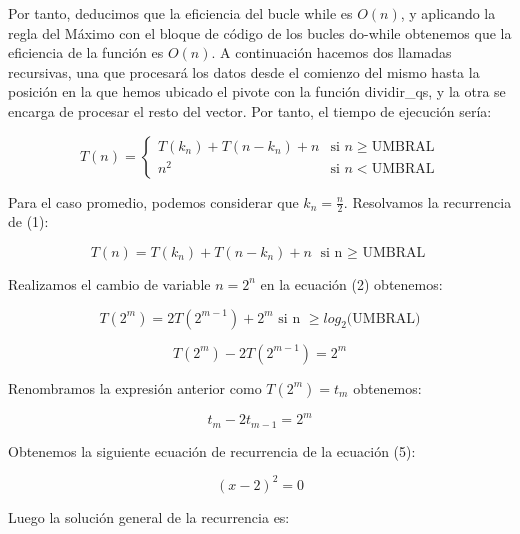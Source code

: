 \documentclass{homework}
\begin{document}
    Por tanto, deducimos que la eficiencia del bucle while es $O(n)$, y aplicando la regla del 
    Máximo con el bloque de código de los bucles do-while obtenemos que la eficiencia de la función es $O(n)$. A continuación hacemos dos llamadas
    recursivas, una que procesará los datos desde el comienzo del mismo hasta la posición en la que hemos ubicado el pivote con la 
    función dividir\_qs, y la otra se encarga de procesar el resto del vector. Por tanto, el tiempo de ejecución sería:

    \begin{equation}
        T(n) = \left\{ \begin{array}{lr} T(k_n) + T(n-k_n) + n & \text{si } n \geq \text{UMBRAL}\\ n^2 & \text{si } n < \text{UMBRAL} \end{array} \right.
    \end{equation}

    Para el caso promedio, podemos considerar que $k_{n} = \frac{n}{2}$. Resolvamos la recurrencia de (1):
    
    \begin{equation}
        T(n) = T(k_n) + T(n-k_n) + n \text{ si n $\geq$ UMBRAL}
    \end{equation}

    Realizamos el cambio de variable $n = 2^{n}$ en la ecuación (2) obtenemos:

    \begin{equation}
        T(2^{m}) = 2T(2^{m-1}) + 2^{m} \text{ si n $\geq log_{2}$(UMBRAL)} 
    \end{equation}

    \begin{equation}
        T(2^{m}) - 2T(2^{m-1}) = 2^{m}
    \end{equation}

    Renombramos la expresión anterior como $T(2^{m}) = t_{m}$ obtenemos:

    \begin{equation}
        t_{m} - 2t_{m-1} = 2^{m}
    \end{equation}
    
    Obtenemos la siguiente ecuación de recurrencia de la ecuación (5):

    \begin{equation}
        (x-2)^{2} = 0
    \end{equation}

    Luego la solución general de la recurrencia es:
\end{document}
